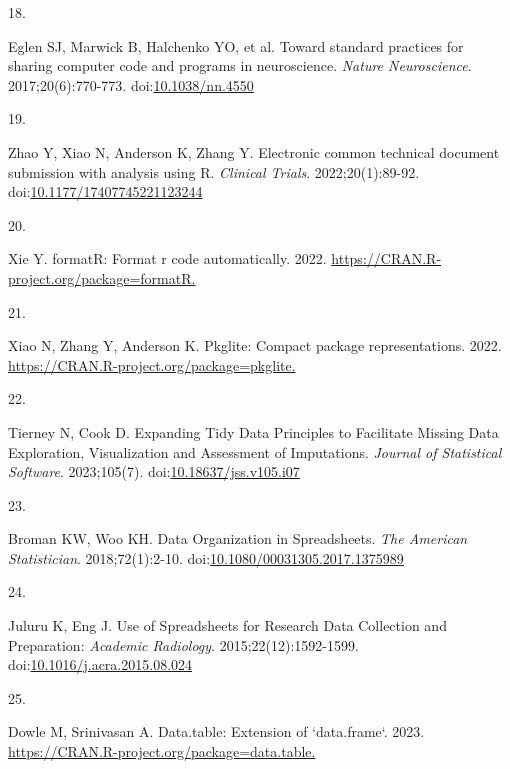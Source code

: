 \documentclass[
]{book}
\newlength{\cslhangindent}
\newlength{\csllabelwidth}
\newlength{\cslentryspacingunit} %
\newenvironment{CSLReferences}[2] %
 {%
  \setlength{\parindent}{0pt}
  \ifodd #1
  \let\oldpar\par
  \def\par{\hangindent=\cslhangindent\oldpar}
  \fi
  \setlength{\parskip}{#2\cslentryspacingunit}
 }%
 {}
\newcommand{\CSLLeftMargin}[1]{\parbox[t]{\csllabelwidth}{#1}}
\newcommand{\CSLRightInline}[1]{\parbox[t]{\linewidth - \csllabelwidth}{#1}\break}
\begin{document}
\begin{CSLReferences}{0}{0}
\leavevmode{}%
\CSLLeftMargin{18. }%
\CSLRightInline{Eglen SJ, Marwick B, Halchenko YO, et al. Toward standard practices for sharing computer code and programs in neuroscience. \emph{Nature Neuroscience}. 2017;20(6):770-773. doi:\href{https://doi.org/10.1038/nn.4550}{10.1038/nn.4550}}

\leavevmode{}%
\CSLLeftMargin{19. }%
\CSLRightInline{Zhao Y, Xiao N, Anderson K, Zhang Y. Electronic common technical document submission with analysis using R. \emph{Clinical Trials}. 2022;20(1):89-92. doi:\href{https://doi.org/10.1177/17407745221123244}{10.1177/17407745221123244}}

\leavevmode{}%
\CSLLeftMargin{20. }%
\CSLRightInline{Xie Y. formatR: Format r code automatically. 2022. \href{https://CRAN.R-project.org/package=formatR}{https://CRAN.R-project.org/package=formatR.}}

\leavevmode{}%
\CSLLeftMargin{21. }%
\CSLRightInline{Xiao N, Zhang Y, Anderson K. Pkglite: Compact package representations. 2022. \href{https://CRAN.R-project.org/package=pkglite}{https://CRAN.R-project.org/package=pkglite.}}

\leavevmode{}%
\CSLLeftMargin{22. }%
\CSLRightInline{Tierney N, Cook D. Expanding Tidy Data Principles to Facilitate Missing Data Exploration, Visualization and Assessment of Imputations. \emph{Journal of Statistical Software}. 2023;105(7). doi:\href{https://doi.org/10.18637/jss.v105.i07}{10.18637/jss.v105.i07}}

\leavevmode{}%
\CSLLeftMargin{23. }%
\CSLRightInline{Broman KW, Woo KH. Data Organization in Spreadsheets. \emph{The American Statistician}. 2018;72(1):2-10. doi:\href{https://doi.org/10.1080/00031305.2017.1375989}{10.1080/00031305.2017.1375989}}

\leavevmode{}%
\CSLLeftMargin{24. }%
\CSLRightInline{Juluru K, Eng J. Use of Spreadsheets for Research Data Collection and Preparation: \emph{Academic Radiology}. 2015;22(12):1592-1599. doi:\href{https://doi.org/10.1016/j.acra.2015.08.024}{10.1016/j.acra.2015.08.024}}

\leavevmode{}%
\CSLLeftMargin{25. }%
\CSLRightInline{Dowle M, Srinivasan A. Data.table: Extension of `data.frame`. 2023. \href{https://CRAN.R-project.org/package=data.table}{https://CRAN.R-project.org/package=data.table.}}


\end{CSLReferences}
\end{document}
